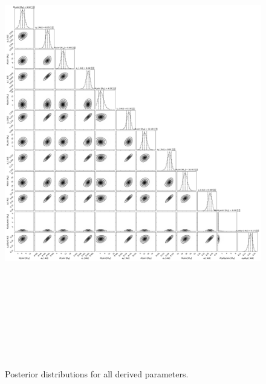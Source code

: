 \documentclass{emulateapj}
\begin{document}
\begin{figure}[!h]
\centering

\includegraphics[height=8.0in,width=6.0in,keepaspectratio]{TOI-1246_add_de_corner_derived_pars.pdf}
\caption{Posterior distributions for all derived parameters.}
\end{figure} 

\end{document}
